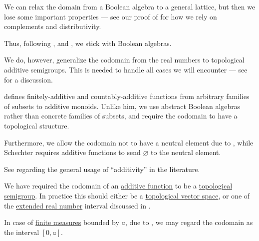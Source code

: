 \begin{comments}
  \item We can relax the domain from a Boolean algebra to a general lattice, but then we lose some important properties --- see our proof of  for how we rely on complements and distributivity.

  Thus, following
  ,
   and
  ,
  we stick with Boolean algebras.

  We do, however, generalize the codomain from the real numbers to topological additive semigroups. This is needed to handle all cases we will encounter --- see  for a discussion.

  \item {} defines finitely-additive and countably-additive functions from arbitrary families of subsets to additive monoids. Unlike him, we use abstract Boolean algebras rather than concrete families of subsets, and require the codomain to have a topological structure.

  Furthermore, we allow the codomain not to have a neutral element due to , while Schechter requires additive functions to send \( \varnothing \) to the neutral element.

  \item See  regarding the general usage of \enquote{additivity} in the literature.
\end{comments}

\begin{remark}\label{rem:lattice_additive_function_range}
  We have required the codomain of an \hyperref[def:boolean_algebra_additive_function]{additive function} to be a \hyperref[rem:topological_first_order_structures]{topological} \hyperref[con:additive_semigroup]{semigroup}. In practice this should either be a \hyperref[def:topological_vector_space]{topological vector space}, or one of the \hyperref[def:extended_real_numbers]{extended real number} interval discussed in .

  In case of \hyperref[def:finite_measure]{finite measures} bounded by \( a \), due to , we may regard the codomain as the interval \( [0, a] \).
\end{remark}


